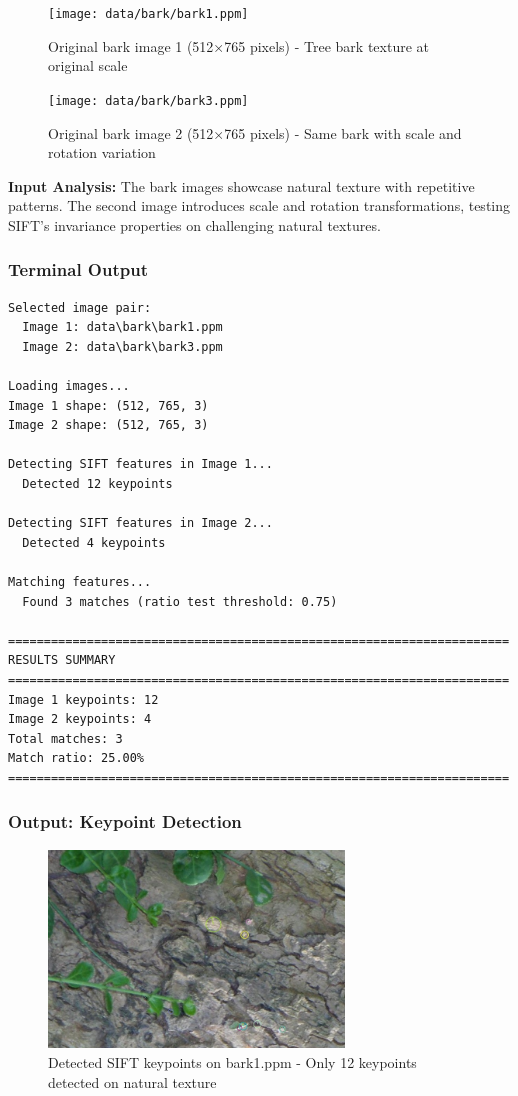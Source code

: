 \documentclass[12pt,a4paper]{article}
\begin{document}
\begin{figure}[H]
\centering
\texttt{[image: data/bark/bark1.ppm]}
\caption{Original bark image 1 (512×765 pixels) - Tree bark texture at original scale}
\label{fig:bark1_input}
\end{figure}

\begin{figure}[H]
\centering
\texttt{[image: data/bark/bark3.ppm]}
\caption{Original bark image 2 (512×765 pixels) - Same bark with scale and rotation variation}
\label{fig:bark3_input}
\end{figure}

\textbf{Input Analysis:} The bark images showcase natural texture with repetitive patterns. The second image introduces scale and rotation transformations, testing SIFT's invariance properties on challenging natural textures.

\subsubsection{Terminal Output}
\begin{lstlisting}
Selected image pair:
  Image 1: data\bark\bark1.ppm
  Image 2: data\bark\bark3.ppm

Loading images...
Image 1 shape: (512, 765, 3)
Image 2 shape: (512, 765, 3)

Detecting SIFT features in Image 1...
  Detected 12 keypoints

Detecting SIFT features in Image 2...
  Detected 4 keypoints

Matching features...
  Found 3 matches (ratio test threshold: 0.75)

======================================================================
RESULTS SUMMARY
======================================================================
Image 1 keypoints: 12
Image 2 keypoints: 4
Total matches: 3
Match ratio: 25.00%
======================================================================
\end{lstlisting}

\subsubsection{Output: Keypoint Detection}

\begin{figure}[H]
\centering
\includegraphics[width=0.7\textwidth]{report/figures/bark1_keypoints.jpg}
\caption{Detected SIFT keypoints on bark1.ppm - Only 12 keypoints detected on natural texture}
\label{fig:bark1_keypoints}
\end{figure}
\end{document}

